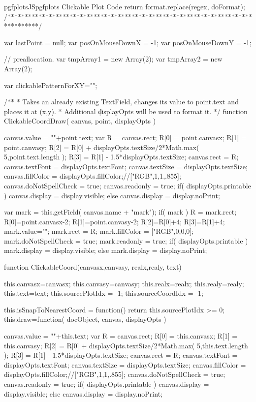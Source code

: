 {{\begin{insDLJS}[processAnnotatedPlot]{pgfplotsJS}{pgfplots Clickable Plot Code}
{    return format.replace(regex, doFormat);
}
/*********************************************************************************/


var lastPoint = null;
var posOnMouseDownX = -1;
var posOnMouseDownY = -1;

// preallocation.
var tmpArray1 = new Array(2);
var tmpArray2 = new Array(2);

var clickablePatternForXY="";

/**
 * Takes an already existing TextField, changes its value to point.text and places it at (x,y).
 * Additional \c displayOpts will be used to format it.
 */
function ClickableCoordDraw( canvas, point, displayOpts )
{
	canvas.value = ""+point.text;
	var R = canvas.rect;
	R[0] = point.canvasx;
	R[1] = point.canvasy;
	R[2] = R[0] + displayOpts.textSize/2*Math.max( 5,point.text.length );
	R[3] = R[1] - 1.5*displayOpts.textSize;
	canvas.rect = R;
	canvas.textFont = displayOpts.textFont;
	canvas.textSize = displayOpts.textSize;
	canvas.fillColor = displayOpts.fillColor;//["RGB",1,1,.855];
	canvas.doNotSpellCheck = true;
	canvas.readonly = true;
	if( displayOpts.printable )
		canvas.display = display.visible;
	else
		canvas.display = display.noPrint;
	
	var mark = this.getField( canvas.name + "mark");
	if( mark ) {
		R = mark.rect;
		R[0]=point.canvasx-2;
		R[1]=point.canvasy-2;
		R[2]=R[0]+4;
		R[3]=R[1]+4;
		mark.value="";
		mark.rect = R;
		mark.fillColor = ["RGB",0,0,0];
		mark.doNotSpellCheck = true;
		mark.readonly = true;
		if( displayOpts.printable )
			mark.display = display.visible;
		else
			mark.display = display.noPrint;
	}
}

function ClickableCoord(canvasx,canvasy, realx,realy, text)
{
	this.canvasx=canvasx;
	this.canvasy=canvasy;
	this.realx=realx;
	this.realy=realy;
	this.text=text;
	this.sourcePlotIdx = -1;
	this.sourceCoordIdx = -1;

	this.isSnapToNearestCoord = function() {
		return this.sourcePlotIdx >= 0;
	}
	this.draw=function( docObject, canvas, displayOpts )
	{
		canvas.value = ""+this.text;
		var R = canvas.rect;
		R[0] = this.canvasx;
		R[1] = this.canvasy;
		R[2] = R[0] + displayOpts.textSize/2*Math.max( 5,this.text.length );
		R[3] = R[1] - 1.5*displayOpts.textSize;
		canvas.rect = R;
		canvas.textFont = displayOpts.textFont;
		canvas.textSize = displayOpts.textSize;
		canvas.fillColor = displayOpts.fillColor;//["RGB",1,1,.855];
		canvas.doNotSpellCheck = true;
		canvas.readonly = true;
		if( displayOpts.printable )
			canvas.display = display.visible;
		else
			canvas.display = display.noPrint;
		
}}
\end{insDLJS}}}
